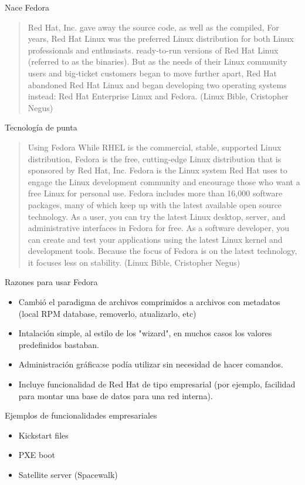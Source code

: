 \documentclass[presentation]{beamer}
\begin{document}
\begin{frame}[label=sec-3]{Nace Fedora}
\begin{quote}
 Red Hat, Inc. gave away the source code, as well as the compiled,
For years, Red Hat Linux was the preferred Linux distribution for both Linux professionals and enthusiasts.
ready-to-run versions of Red Hat Linux (referred to as the binaries).
 But as the needs of their Linux community users and big-ticket customers began to move further apart,
 Red Hat abandoned Red Hat Linux and began developing two operating systems instead: Red Hat Enterprise Linux and Fedora. (Linux Bible, Cristopher Negus)
\end{quote}
\end{frame}
\begin{frame}[label=sec-4]{Tecnología de punta}
\begin{quote}
Using Fedora
While RHEL is the commercial, stable, supported Linux distribution, Fedora is the free, cutting-edge Linux distribution that is sponsored by Red Hat, Inc.
Fedora is the Linux system Red Hat uses to engage the Linux development community and encourage those who want a free Linux for personal use.
Fedora includes more than 16,000 software packages, many of which keep up with the latest available open source technology.
 As a user, you can try the latest Linux desktop, server, and administrative interfaces in Fedora for free. As a software developer, you can create and test your applications using the latest Linux kernel and development tools.
Because the focus of Fedora is on the latest technology, it focuses less on stability. (Linux Bible, Cristopher Negus)
\end{quote}
\end{frame}


\begin{frame}[label=sec-5]{Razones para usar Fedora}
\begin{itemize}
\item Cambió el paradigma de archivos comprimidos a archivos con metadatos (local RPM database, removerlo, atualizarlo, etc)
\item Intalación simple, al estilo de los "wizard", en muchos casos los valores predefinidos bastaban.
\item Administración gráfica:se podía utilizar sin necesidad de hacer comandos.
\item Incluye funcionalidad de Red Hat de tipo empresarial (por ejemplo, facilidad para montar una base de datos para una red interna).
\end{itemize}

\begin{block}{Ejemplos de funcionalidades empresariales}
\begin{itemize}
\item Kickstart files
\item PXE boot
\item Satellite server (Spacewalk)
\end{itemize}
\end{block}
\end{frame}
\end{document}
